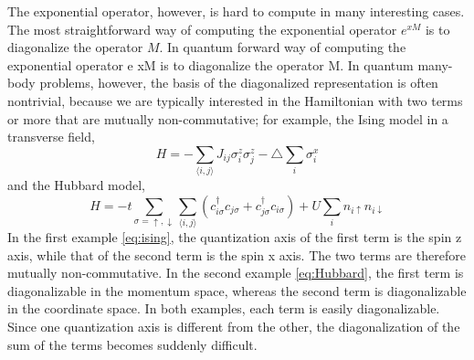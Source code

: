 The exponential operator, however, is hard to compute in many interesting cases. The most straightforward way of computing the exponential operator $e^{xM}$ is to diagonalize the operator $M$. In quantum forward way of computing the exponential operator e xM is to diagonalize the operator M. In quantum many-body problems, however, the basis of the diagonalized representation is often nontrivial, because we are typically interested in the Hamiltonian with two terms or more that are mutually non-commutative; for example, the Ising model in a transverse field,
\begin{equation} \label{eq:ising}
H = -\sum_{\langle i,j \rangle} J_{ij} \sigma_i^z \sigma_j^z - \triangle\sum_i \sigma_i^x
\end{equation}
and the Hubbard model,
\begin{equation} \label{eq:Hubbard}
H = -t \sum_{\sigma = \uparrow ,\downarrow} \sum_{\langle i,j \rangle} (c_{i\sigma}^\dagger c_{j\sigma} + c_{j\sigma}^\dagger c_{i\sigma}) + U\sum_i n_{i\uparrow} n_{i\downarrow}
\end{equation}
In the first example \eqref{eq:ising}, the quantization axis of the first term is the spin z axis, while that of the second term is the spin x axis. The two terms are therefore mutually non-commutative. In the second example \eqref{eq:Hubbard}, the first term is diagonalizable in the momentum space, whereas the second term is diagonalizable in the coordinate space. In both examples, each term is easily diagonalizable. Since one quantization axis is different from the other, the diagonalization of the sum of the terms becomes suddenly difficult.
